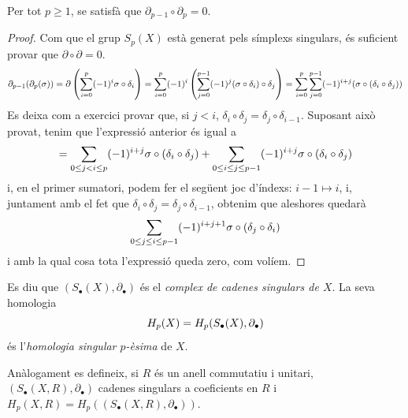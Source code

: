 \documentclass[../main.tex]{subfiles}
\begin{document}
\begin{lema}
\label{lema:operadorvorasingular} Per tot $p\geq 1$, se satisfà que $\partial_{p-1}\circ \partial_p = 0$.
\end{lema}
\begin{proof}
Com que el grup $S_p(X)$ està generat pels símplexs singulars, és suficient provar que $\partial\circ\partial = 0$.
\begin{equation}
    \notag
    \partial_{p-1}(\partial_p(\sigma)) = \partial\left(\sum_{i=0}^p(-1)^{i}\sigma\circ\delta_i\right) = \sum_{i=0}^p(-1)^{i}\left(\sum_{j=0}^{p-1}(-1)^j(\sigma\circ\delta_i)\circ\delta_j\right) = \sum_{i=0}^p\sum_{j=0}^{p-1}(-1)^{i+j}(\sigma\circ(\delta_i\circ\delta_j))
\end{equation}
Es deixa com a exercici provar que, si $j<i$, $\delta_i\circ\delta_j =\delta_j\circ\delta_{i-1}$. Suposant això provat, tenim que l'expressió anterior és igual a
\begin{equation}
    \notag
    =\sum_{0\leq j<i\leq p}(-1)^{i+j}\sigma\circ(\delta_i\circ\delta_j) + \sum_{0\leq i\leq j\leq p-1}(-1)^{i+j}\sigma\circ(\delta_i\circ\delta_j)
\end{equation}
i, en el primer sumatori, podem fer el següent joc d'índexs: $i-1\mapsto i$, i, juntament amb el fet que $\delta_i\circ\delta_j = \delta_j\circ\delta_{i-1}$, obtenim que aleshores quedarà
\begin{equation}
    \notag
    \sum_{0\leq j\leq i\leq p-1}(-1)^{i+j+1}\sigma\circ(\delta_j\circ\delta_i)
\end{equation}
i amb la qual cosa tota l'expressió queda zero, com volíem.
\end{proof}

\begin{defi}
Es diu que $(S_\bullet(X),\partial_\bullet)$ és el \textit{complex de cadenes singulars de $X$}. La seva homologia
\begin{equation}
    \notag
    H_p(X) = H_p(S_\bullet(X),\partial_\bullet)
\end{equation}
és l'\textit{homologia singular $p$-èsima} de $X$.
\end{defi}


Anàlogament es defineix, si $R$ és un anell commutatiu i unitari, $(S_\bullet(X,R),\partial_\bullet)$ cadenes singulars a coeficients en $R$ i $H_p(X,R) = H_p((S_\bullet(X,R),\partial_\bullet))$.
\end{document}

